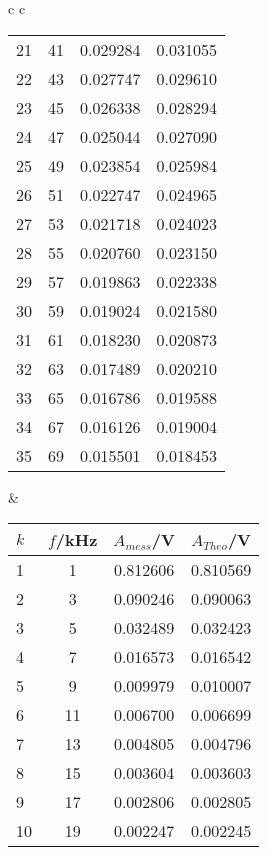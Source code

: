 \begin{center}
\begin{tabular}{c c}
\begin{tabular}{l | c | c c}
            21 &      41 &  0.029284 &  0.031055 \\
            22 &      43 &  0.027747 &  0.029610 \\
            23 &      45 &  0.026338 &  0.028294 \\
            24 &      47 &  0.025044 &  0.027090 \\
            25 &      49 &  0.023854 &  0.025984 \\
            26 &      51 &  0.022747 &  0.024965 \\
            27 &      53 &  0.021718 &  0.024023 \\
            28 &      55 &  0.020760 &  0.023150 \\
            29 &      57 &  0.019863 &  0.022338 \\
            30 &      59 &  0.019024 &  0.021580 \\
            31 &      61 &  0.018230 &  0.020873 \\
            32 &      63 &  0.017489 &  0.020210 \\
            33 &      65 &  0.016786 &  0.019588 \\
            34 &      67 &  0.016126 &  0.019004 \\
            35 &      69 &  0.015501 &  0.018453 \\
        \end{tabular} \hspace{0,5cm} &
        \begin{tabular}{l | c | c c}
            $k$ & $f$/kHz &  $A_{mess}$/V & $A_{Theo}$/V \\
            \hline
            1  &       1 &  0.812606 &  0.810569 \\
            2  &       3 &  0.090246 &  0.090063 \\
            3  &       5 &  0.032489 &  0.032423 \\
            4  &       7 &  0.016573 &  0.016542 \\
            5  &       9 &  0.009979 &  0.010007 \\
            6  &      11 &  0.006700 &  0.006699 \\
            7  &      13 &  0.004805 &  0.004796 \\
            8  &      15 &  0.003604 &  0.003603 \\
            9  &      17 &  0.002806 &  0.002805 \\
            10 &      19 &  0.002247 &  0.002245 \\

\end{tabular}
\end{tabular}
\end{center}

